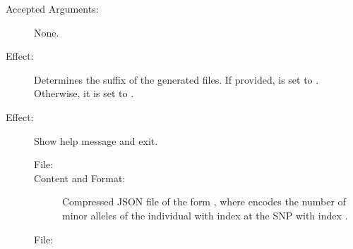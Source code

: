 \documentclass[a4paper,10pt,english]{sphinxhowto}
\begin{document}
\begin{description}
\begin{description}
\begin{description}
\item[{Accepted Arguments:}] \leavevmode
None.

\item[{Effect:}] \leavevmode
Determines the suffix  of the generated files. If provided,  is set to .
Otherwise, it is set to .

\end{description}

\item[{\sphinxcode{\sphinxupquote{-h, -{-}help}}}] \leavevmode\begin{description}
\item[{Effect:}] \leavevmode
Show help message and exit.

\end{description}

\end{description}

\item[{\sphinxstylestrong{Output:}}] \leavevmode\begin{description}
\item[{}] \leavevmode\begin{description}
\item[{File:}] \leavevmode
{}

\item[{Content and Format:}] \leavevmode
Compressed JSON file of the form ,
where  encodes the number of minor alleles of the individual with index  at the SNP with index .

\end{description}

\item[{}] \leavevmode\begin{description}
\item[{File:}] \leavevmode
{}


\end{description}
\end{description}
\end{description}
\end{document}
